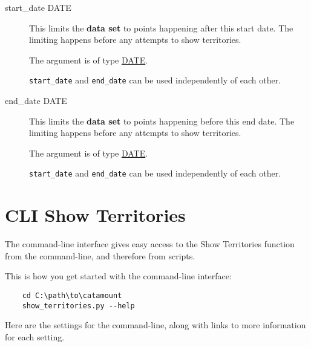 \begin{description}
\item[start\_date DATE]
\hypertarget{territory-start-date}{}

This limits the \textbf{data set} to points happening after this start
date. The limiting happens before any attempts to show territories.

The argument is of type \hyperlink{argument-type-date}{DATE}.

\verb=start_date= and \verb=end_date= can be used independently of
each other.

\item[end\_date DATE]
\hypertarget{territory-end-date}{}

This limits the \textbf{data set} to points happening before this end
date. The limiting happens before any attempts to show territories.

The argument is of type \hyperlink{argument-type-date}{DATE}.

\verb=start_date= and \verb=end_date= can be used independently of
each other.

\end{description}


\section{CLI Show Territories}

The command-line interface gives easy access to the Show Territories
function from the command-line, and therefore from scripts.

This is how you get started with the command-line interface:

\begin{verbatim}
    cd C:\path\to\catamount
    show_territories.py --help
\end{verbatim}

Here are the settings for the command-line, along with links to
more information for each setting.

